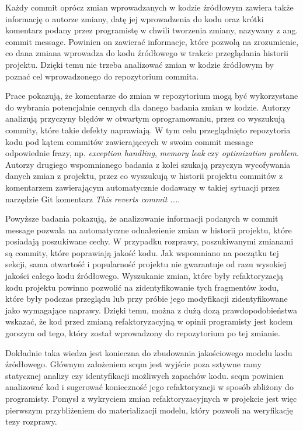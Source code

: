 \documentclass[12pt]{report}
\begin{document}
Każdy commit oprócz zmian wprowadzanych w kodzie źródłowym zawiera także informację o autorze zmiany, datę jej wprowadzenia do kodu oraz krótki komentarz podany przez programistę w chwili tworzenia zmiany, nazywany z ang. commit message. Powinien on zawierać informacje, które pozwolą na zrozumienie, co dana zmiana wprowadza do kodu źródłowego w trakcie przeglądania historii projektu. Dzięki temu nie trzeba analizować zmian w kodzie źródłowym by poznać cel wprowadzonego do repozytorium commita.

Prace \cite{ray2014large,shimagaki2016commits} pokazują, że komentarze do zmian w repozytorium mogą być wykorzystane do wybrania potencjalnie cennych dla danego badania zmian w kodzie. Autorzy \cite{ray2014large} analizują przyczyny błędów w otwartym oprogramowaniu, przez co wyszukują commity, które takie defekty naprawiają. W tym celu przeglądnięto repozytoria kodu pod kątem commitów zawierająceych w swoim commit message odpowiednie frazy, np. \textit{exception handling}, \textit{memory leak} czy \textit{optimization problem}. Autorzy drugiego wspomnianego badania \cite{shimagaki2016commits} z kolei szukają przyczyn wycofywania danych zmian z projektu, przez co wyszukują w historii projektu commitów z komentarzem zawierającym automatycznie dodawany w takiej sytuacji przez narzędzie Git komentarz \textit{This reverts commit ...}. 

Powyższe badania pokazują, że analizowanie informacji podanych w commit message pozwala na automatyczne odnalezienie zmian w historii projektu, które posiadają poszukiwane cechy. W przypadku rozprawy, poszukiwanymi zmianami są commity, które poprawiają jakość kodu. Jak wspomniano na początku tej sekcji, sama otwartość i popularność projektu nie gwarantuje od razu wysokiej jakości całego kodu źródłowego. Wyszukanie zmian, które były refaktoryzacją kodu projektu powinno pozwolić na zidentyfikowanie tych fragmentów kodu, które były podczas przeglądu lub przy próbie jego modyfikacji zidentyfikowane jako wymagające naprawy. Dzięki temu, można z dużą dozą prawdopodobieństwa wskazać, że kod przed zmianą refaktoryzacyjną w opinii programisty jest kodem gorszym od tego, który został wprowadzony do repozytorium po tej zmianie.

Dokładnie taka wiedza jest konieczna do zbudowania jakościowego modelu kodu źródłowego. Głównym założeniem \gls{scqm} jest wyjście poza sztywne ramy statycznej analizy czy identyfikacji możliwych zapachów kodu. \gls{scqm} powinien analizować kod i sugerować konieczność jego refaktoryzacji w sposób zbliżony do programisty. Pomysł z wykryciem zmian refaktoryzacyjnych w projekcie jest więc pierwszym przybliżeniem do materializacji modelu, który pozwoli na weryfikację tezy rozprawy.
\end{document}
